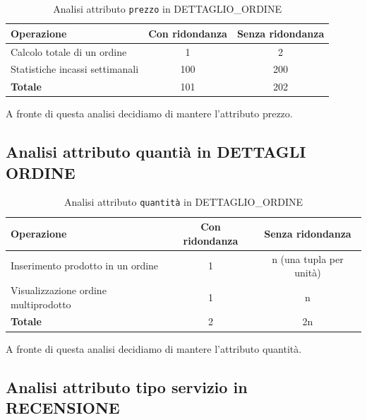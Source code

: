 \documentclass[a4paper,12pt]{report}
\begin{document}
\begin{table}[H]
	\centering
	\begin{tabular}{|l|c|c|}
		\hline
		\textbf{Operazione}             & \textbf{Con ridondanza} & \textbf{Senza ridondanza} \\
		\hline
		Calcolo totale di un ordine     & 1                       & 2                         \\
		Statistiche incassi settimanali & 100                     & 200                       \\
		\hline
		\textbf{Totale}                 & 101                     & 202                       \\
		\hline
	\end{tabular}
	\caption{Analisi attributo \texttt{prezzo} in DETTAGLIO\_ORDINE}
\end{table}

A fronte di questa analisi decidiamo di mantere l'attributo prezzo.

\subsection{Analisi attributo quantià in DETTAGLI ORDINE}

\begin{table}[H]
	\centering
	\begin{tabular}{|l|c|c|}
		\hline
		\textbf{Operazione}                  & \textbf{Con ridondanza} & \textbf{Senza ridondanza} \\
		\hline
		Inserimento prodotto in un ordine    & 1                       & n (una tupla per unità)   \\
		Visualizzazione ordine multiprodotto & 1                       & n                         \\
		\hline
		\textbf{Totale}                      & 2                       & 2n                        \\
		\hline
	\end{tabular}
	\caption{Analisi attributo \texttt{quantità} in DETTAGLIO\_ORDINE}
\end{table}

A fronte di questa analisi decidiamo di mantere l'attributo quantità.

\subsection{Analisi attributo tipo servizio in RECENSIONE}
\end{document}
